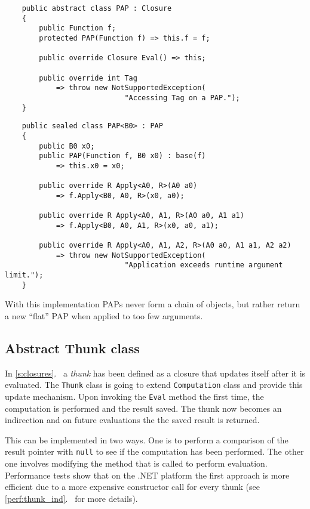 \documentclass[en]{pracamgr}
\newcommand{\myref}[1]{\ref{#1}.~\textit{\nameref{#1}}}
\begin{document}
\begin{verbatim}
    public abstract class PAP : Closure
    {
        public Function f;
        protected PAP(Function f) => this.f = f;

        public override Closure Eval() => this;

        public override int Tag
            => throw new NotSupportedException(
                            "Accessing Tag on a PAP.");
    }
\end{verbatim}
\begin{verbatim}
    public sealed class PAP<B0> : PAP
    {
        public B0 x0;
        public PAP(Function f, B0 x0) : base(f)
            => this.x0 = x0;

        public override R Apply<A0, R>(A0 a0)
            => f.Apply<B0, A0, R>(x0, a0);
        
        public override R Apply<A0, A1, R>(A0 a0, A1 a1) 
            => f.Apply<B0, A0, A1, R>(x0, a0, a1);
        
        public override R Apply<A0, A1, A2, R>(A0 a0, A1 a1, A2 a2)
            => throw new NotSupportedException(
                            "Application exceeds runtime argument limit.");
    }
\end{verbatim}

With this implementation PAPs never form a chain of objects, but rather return a new ``flat'' PAP when applied to too few arguments.

\subsection{Abstract Thunk class}\label{s:thunk_class}

In \myref{s:closures} a \textit{thunk} has been defined as a
closure that updates itself after it is evaluated.
The \texttt{Thunk} class is going to extend
\texttt{Computation} class and provide this update
mechanism. Upon invoking the \texttt{Eval} method the first
time, the computation is performed and the result saved.
The thunk now becomes an indirection and on future evaluations
the the saved result is returned.

This can be implemented in two ways. One is to perform a comparison
of the result pointer with \texttt{null} to see if
the computation has been performed.
The other one involves modifying the method that is called
to perform evaluation.
Performance tests show that on the .NET platform the first approach is more efficient
due to a more expensive constructor call for every thunk
(see \myref{perf:thunk_ind} for more details).
\end{document}
